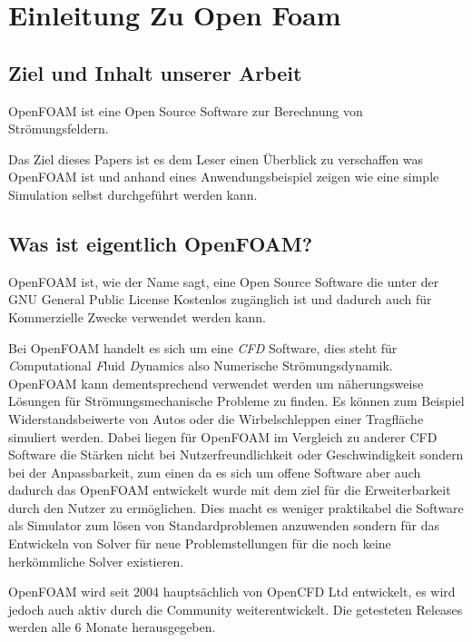 %
%
%
%
\section{Einleitung Zu Open Foam\label{openfoam:section:Einleitung}}

\subsection{Ziel und Inhalt unserer Arbeit}
OpenFOAM ist eine Open Source Software zur Berechnung von Strömungsfeldern. 

Das Ziel dieses Papers ist es dem Leser einen Überblick zu verschaffen was OpenFOAM ist und anhand eines 
Anwendungsbeispiel zeigen wie eine simple Simulation selbst durchgeführt werden kann.

\subsection{Was ist eigentlich OpenFOAM?\label{openfoam:section:WasIstOpenFoam}}
OpenFOAM ist, wie der Name sagt, eine Open Source Software die unter der GNU
General Public License Kostenlos zugänglich ist und dadurch auch für Kommerzielle Zwecke 
verwendet werden kann. 

Bei OpenFOAM handelt es sich um eine \emph{CFD} Software, dies steht für \emph{C}omputational \emph{F}luid \emph{D}ynamics also Numerische Strömungsdynamik.
OpenFOAM kann dementsprechend verwendet werden um näherungsweise Lösungen für 
Strömungsmechanische Probleme zu finden.
Es können zum Beispiel Widerstandsbeiwerte von Autos oder die Wirbelschleppen einer Tragfläche simuliert werden.
Dabei liegen für OpenFOAM im Vergleich zu anderer CFD Software die Stärken nicht bei Nutzerfreundlichkeit oder Geschwindigkeit sondern bei der Anpassbarkeit, zum einen da es sich um offene Software aber auch dadurch das OpenFOAM entwickelt wurde mit dem ziel für die Erweiterbarkeit durch den Nutzer zu ermöglichen. Dies macht es weniger praktikabel die Software als Simulator zum lösen von Standardproblemen anzuwenden sondern für das Entwickeln von Solver für neue Problemstellungen für die noch keine herkömmliche Solver existieren.

OpenFOAM wird seit 2004 hauptsächlich von OpenCFD Ltd entwickelt, es wird jedoch auch aktiv durch die Community weiterentwickelt.
Die getesteten Releases werden alle 6 Monate herausgegeben. \cite{openfoam:greenshieldsweller2022}

